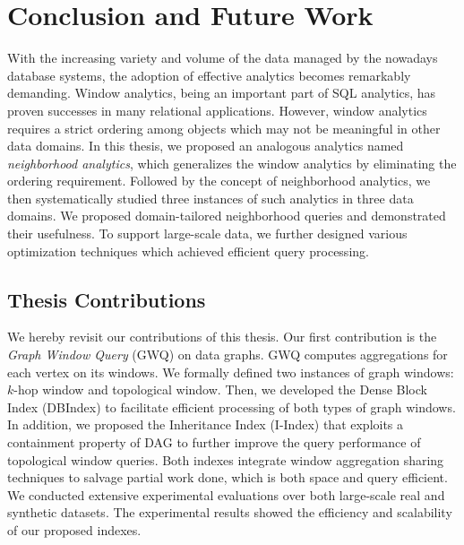 \chapter{Conclusion and Future Work}
With the increasing variety and volume of the data managed
by the nowadays database systems, the adoption of effective 
analytics becomes remarkably demanding. 
Window analytics, being
an important part of SQL analytics, has proven successes in
many relational applications. However, window analytics requires a
strict ordering among objects which may not be meaningful
in other data domains.  In this thesis, we proposed
an analogous analytics named \emph{neighborhood analytics},
which generalizes the window analytics by eliminating the
ordering requirement. Followed by the concept of
neighborhood analytics, we then systematically studied
three instances of such analytics in three data domains.
We proposed domain-tailored neighborhood queries and demonstrated
their usefulness. To support large-scale data, 
we further designed various optimization techniques which achieved
efficient query processing.

\section{Thesis Contributions}
We hereby revisit our contributions of this thesis. Our first
contribution is the \emph{Graph Window Query} (GWQ) on data graphs. 
GWQ computes aggregations for each vertex on its windows.
We formally defined two instances of graph windows: $k$-hop window and topological window. 
Then, we developed the Dense Block Index (DBIndex) to facilitate efficient 
processing of both types of graph windows. In addition, 
we proposed the Inheritance Index (I-Index) that exploits a
containment property of DAG to further improve the query performance of topological window queries. 
Both indexes integrate window aggregation sharing techniques to salvage partial work done, 
which is both space and query efficient. 
We conducted extensive experimental evaluations over both large-scale real and synthetic datasets. The experimental results showed the efficiency and scalability of our proposed indexes. 

